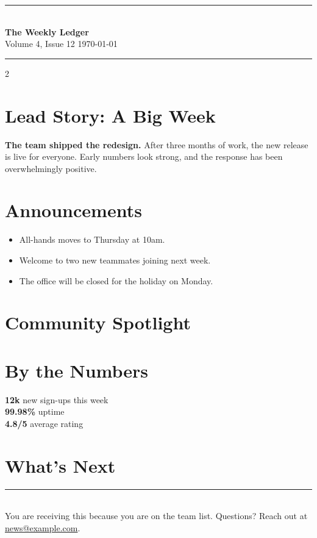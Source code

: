 \documentclass[10pt]{article}
\newcommand{\masthead}[3]{%
  {\color{brand}\rule{\linewidth}{2pt}}\\[4pt]
  {\fontsize{30}{34}\selectfont\bfseries\color{brand} #1}\\[2pt]
  {\small #2 \hfill #3}\\[2pt]
  {\color{brand}\rule{\linewidth}{0.8pt}}\par\vspace{8pt}}
\begin{document}
\masthead{The Weekly Ledger}{Volume 4, Issue 12}{\today}

\begin{multicols}{2}

\section*{Lead Story: A Big Week}
{\large\bfseries The team shipped the redesign.} After three months of work, the
new release is live for everyone. Early numbers look strong, and the response has
been overwhelmingly positive.

\lipsum[1-2]

\section*{Announcements}
\begin{itemize}
  \item All-hands moves to Thursday at 10am.
  \item Welcome to two new teammates joining next week.
  \item The office will be closed for the holiday on Monday.
\end{itemize}

\section*{Community Spotlight}
\lipsum[3]

\section*{By the Numbers}
\textbf{12k} new sign-ups this week \\
\textbf{99.98\%} uptime \\
\textbf{4.8/5} average rating

\section*{What's Next}
\lipsum[4][1-6]

\end{multicols}

\vfill
{\color{brand}\rule{\linewidth}{0.8pt}}\\[2pt]
{\footnotesize You are receiving this because you are on the team list.
Questions? Reach out at \href{mailto:news@example.com}{news@example.com}.}
\end{document}
